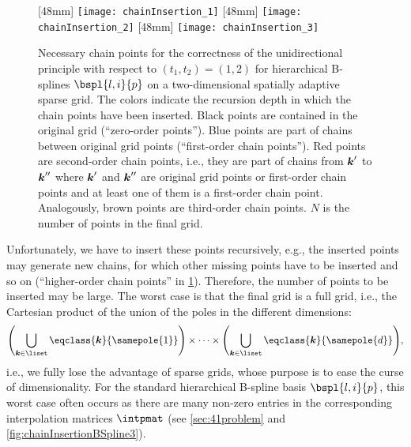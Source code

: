 \begin{figure}
  [48mm]{%
    \texttt{[image: chainInsertion\_1]}%
  }%
  \hfill%
  [48mm]{%
    \texttt{[image: chainInsertion\_2]}%
  }%
  \hfill%
  [48mm]{%
    \texttt{[image: chainInsertion\_3]}%
  }%
  \caption[%
    Chain points for hierarchical B-splines on a sparse grid%
  ]{%
    Necessary chain points for the correctness of the unidirectional principle
    with respect to $(t_1, t_2) = (1, 2)$
    for hierarchical B-splines $\bspl{l,i}{p}$ on a
    two-dimensional spatially adaptive sparse grid.
    The colors indicate the recursion depth in which the
    chain points have been inserted.
    Black points are contained in the original grid
    (``zero-order points'').
    \textcolor{C0}{Blue points} are part of chains
    between original grid points (``first-order chain points'').
    \textcolor{C1}{Red points} are second-order chain points,
    i.e., they are part of chains
    from ${\boldsymbol{k}}'$ to ${\boldsymbol{k}}''$ where ${\boldsymbol{k}}'$ and ${\boldsymbol{k}}''$ are
    original grid points or first-order chain points
    and at least one of them is a first-order chain point.
    Analogously,
    \textcolor{C2}{brown points} are third-order chain points.
    $N$ is the number of points in the final grid.%
  }%
  \label{fig:chainInsertionBSpline}%
\end{figure}

Unfortunately, we have to insert these points recursively,
e.g., the inserted points may generate new chains,
for which other missing points have to be inserted and so on
(``higher-order chain points'' in \cref{fig:chainInsertionBSpline}).
Therefore, the number of points to be inserted may be large.
The worst case is that the final grid is a full grid, i.e.,
the Cartesian product of the union of the poles in the different dimensions:
\begin{equation}
  \paren*{\bigcup_{\*k \in \liset} \eqclass{\*k}{\samepole{1}}}
  \times \dotsb \times
  \paren*{\bigcup_{\*k \in \liset} \eqclass{\*k}{\samepole{d}}},
\end{equation}
i.e., we fully lose the advantage of sparse grids,
whose purpose is to ease the curse of dimensionality.
For the standard hierarchical B-spline basis $\bspl{l,i}{p}$,
this worst case often occurs as there are many non-zero entries
in the corresponding interpolation matrices $\intpmat$
(see \cref{sec:41problem} and \cref{fig:chainInsertionBSpline3}).



